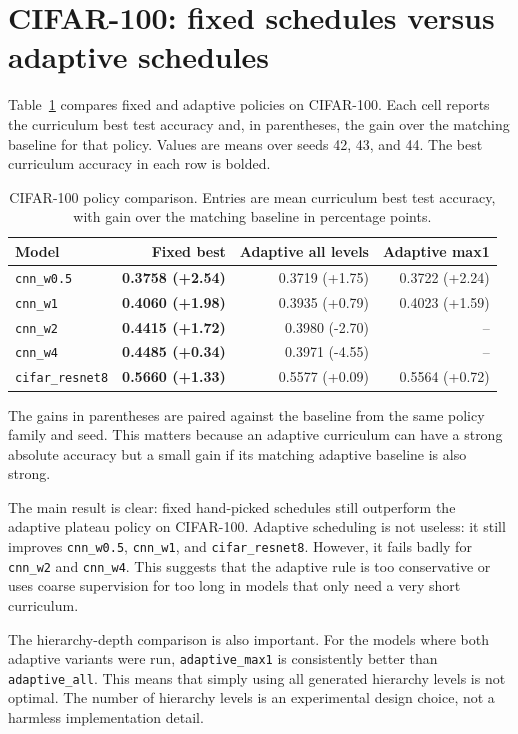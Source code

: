\section{CIFAR-100: fixed schedules versus adaptive schedules}

Table~\ref{tab:appg-cifar100-policy} compares fixed and adaptive policies on
CIFAR-100. Each cell reports the curriculum best test accuracy and, in
parentheses, the gain over the matching baseline for that policy. Values are
means over seeds 42, 43, and 44. The best curriculum accuracy in each row is
bolded.

\begin{table}[h]
\centering
\small
\begin{tabular}{lrrr}
\hline
Model & Fixed best & Adaptive all levels & Adaptive max1 \\
\hline
\texttt{cnn\_w0.5} & \textbf{0.3758 (+2.54)} & 0.3719 (+1.75) & 0.3722 (+2.24) \\
\texttt{cnn\_w1} & \textbf{0.4060 (+1.98)} & 0.3935 (+0.79) & 0.4023 (+1.59) \\
\texttt{cnn\_w2} & \textbf{0.4415 (+1.72)} & 0.3980 (-2.70) & -- \\
\texttt{cnn\_w4} & \textbf{0.4485 (+0.34)} & 0.3971 (-4.55) & -- \\
\texttt{cifar\_resnet8} & \textbf{0.5660 (+1.33)} & 0.5577 (+0.09) & 0.5564 (+0.72) \\
\hline
\end{tabular}
\caption{CIFAR-100 policy comparison. Entries are mean curriculum best test
accuracy, with gain over the matching baseline in percentage points.}
\label{tab:appg-cifar100-policy}
\end{table}

The gains in parentheses are paired against the baseline from the same policy
family and seed. This matters because an adaptive curriculum can have a strong
absolute accuracy but a small gain if its matching adaptive baseline is also
strong.

The main result is clear: fixed hand-picked schedules still outperform the
adaptive plateau policy on CIFAR-100. Adaptive scheduling is not useless: it
still improves \texttt{cnn\_w0.5}, \texttt{cnn\_w1}, and
\texttt{cifar\_resnet8}. However, it fails badly for \texttt{cnn\_w2} and
\texttt{cnn\_w4}. This suggests that the adaptive rule is too conservative or
uses coarse supervision for too long in models that only need a very short
curriculum.

The hierarchy-depth comparison is also important. For the models where both
adaptive variants were run, \texttt{adaptive\_max1} is consistently better than
\texttt{adaptive\_all}. This means that simply using all generated hierarchy
levels is not optimal. The number of hierarchy levels is an experimental design
choice, not a harmless implementation detail.

